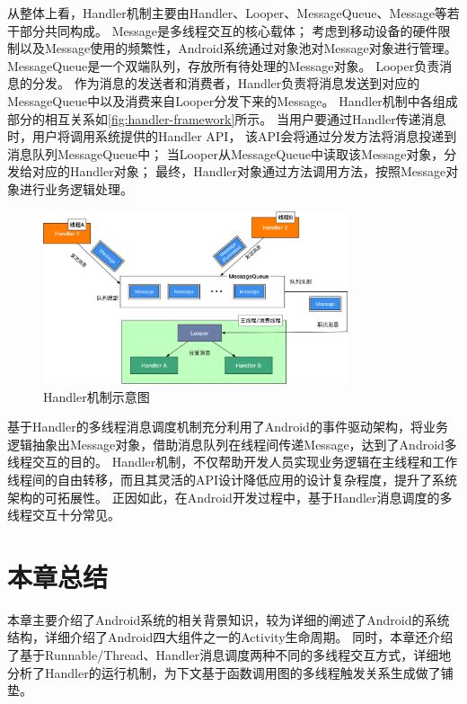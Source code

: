 从整体上看，Handler机制主要由Handler、Looper、MessageQueue、Message等若干部分共同构成。
 Message是多线程交互的核心载体；
考虑到移动设备的硬件限制以及Message使用的频繁性，Android系统通过对象池对Message对象进行管理。
MessageQueue是一个双端队列，存放所有待处理的Message对象。
Looper负责消息的分发。
作为消息的发送者和消费者，Handler负责将消息发送到对应的MessageQueue中以及消费来自Looper分发下来的Message。
Handler机制中各组成部分的相互关系如\autoref{fig:handler-framework}所示。
当用户要通过Handler传递消息时，用户将调用系统提供的Handler API，
该API会将通过分发方法将消息投递到消息队列MessageQueue中；
当Looper从MessageQueue中读取该Message对象，分发给对应的Handler对象；
最终，Handler对象通过方法调用方法，按照Message对象进行业务逻辑处理。
\begin{figure}[!ht]
	\centering
	\includegraphics[width=0.8\textwidth]{./Figures/Handler-framework.png}
	\caption{ Handler机制示意图}
	\label{fig:handler-framework}
\end{figure}

基于Handler的多线程消息调度机制充分利用了Android的事件驱动架构，将业务逻辑抽象出Message对象，借助消息队列在线程间传递Message，达到了Android多线程交互的目的。
Handler机制，不仅帮助开发人员实现业务逻辑在主线程和工作线程间的自由转移，而且其灵活的API设计降低应用的设计复杂程度，提升了系统架构的可拓展性。
正因如此，在Android开发过程中，基于Handler消息调度的多线程交互十分常见。


\section{本章总结}

本章主要介绍了Android系统的相关背景知识，较为详细的阐述了Android的系统结构，详细介绍了Android四大组件之一的Activity生命周期。
同时，本章还介绍了基于Runnable/Thread、Handler消息调度两种不同的多线程交互方式，详细地分析了Handler的运行机制，为下文基于函数调用图的多线程触发关系生成做了铺垫。
